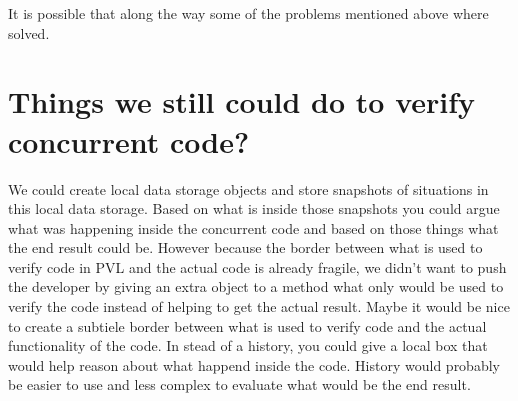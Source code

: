 It is possible that along the way some of the problems mentioned above where solved.

\section{Things we still could do to verify concurrent code?}

We could create local data storage objects and store snapshots of situations in this local data storage. Based on what is inside those snapshots you could argue what was happening inside the concurrent code and based on those things what the end result could be. However because the border between what is used to verify code in PVL and the actual code is already fragile, we didn't want to push the developer by giving an extra object to a method what only would be used to verify the code instead of helping to get the actual result. Maybe it would be nice to create a subtiele border between what is used to verify code and the actual functionality of the code. In stead of a history, you could give a local box that would help reason about what happend inside the code. History would probably be easier to use and less complex to evaluate what would be the end result.